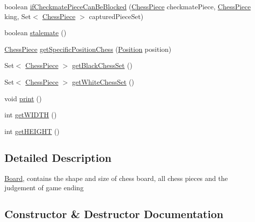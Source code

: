 \begin{DoxyCompactItemize}
\item 
boolean \mbox{\hyperlink{classchess_1_1models_1_1_board_a59a36d62ed2b4ef22b14fda1c10968d8}{if\+Checkmate\+Piece\+Can\+Be\+Blocked}} (\mbox{\hyperlink{classchess_1_1models_1_1_chess_piece}{Chess\+Piece}} checkmate\+Piece, \mbox{\hyperlink{classchess_1_1models_1_1_chess_piece}{Chess\+Piece}} king, Set$<$ \mbox{\hyperlink{classchess_1_1models_1_1_chess_piece}{Chess\+Piece}} $>$ captured\+Piece\+Set)
\item 
boolean \mbox{\hyperlink{classchess_1_1models_1_1_board_aca772c3b56248d6e3fbf97d00a9abaf9}{stalemate}} ()
\item 
\mbox{\hyperlink{classchess_1_1models_1_1_chess_piece}{Chess\+Piece}} \mbox{\hyperlink{classchess_1_1models_1_1_board_a3e21ecd167f3c80dfd260e9acde208c6}{get\+Specific\+Position\+Chess}} (\mbox{\hyperlink{classchess_1_1models_1_1_position}{Position}} position)
\item 
Set$<$ \mbox{\hyperlink{classchess_1_1models_1_1_chess_piece}{Chess\+Piece}} $>$ \mbox{\hyperlink{classchess_1_1models_1_1_board_a4dcc35426fd6ebe9725b2edaa4752310}{get\+Black\+Chess\+Set}} ()
\item 
Set$<$ \mbox{\hyperlink{classchess_1_1models_1_1_chess_piece}{Chess\+Piece}} $>$ \mbox{\hyperlink{classchess_1_1models_1_1_board_a0fab147b0205caf586306a03e758e7bb}{get\+White\+Chess\+Set}} ()
\item 
void \mbox{\hyperlink{classchess_1_1models_1_1_board_af22da20d051a6cc31c6730e5dc80d81e}{print}} ()
\item 
int \mbox{\hyperlink{classchess_1_1models_1_1_board_aeab935c6befad60e51084a78458ebf39}{get\+W\+I\+D\+TH}} ()
\item 
int \mbox{\hyperlink{classchess_1_1models_1_1_board_a28a3d4b9d0738a26666b7c97394242a9}{get\+H\+E\+I\+G\+HT}} ()
\end{DoxyCompactItemize}


\subsection{Detailed Description}
\mbox{\hyperlink{classchess_1_1models_1_1_board}{Board}}, contains the shape and size of chess board, all chess pieces and the judgement of game ending 

\subsection{Constructor \& Destructor Documentation}
\mbox{\label{classchess_1_1models_1_1_board_a742cb1aaa3ec12625098a4ddf24fee19}} 
